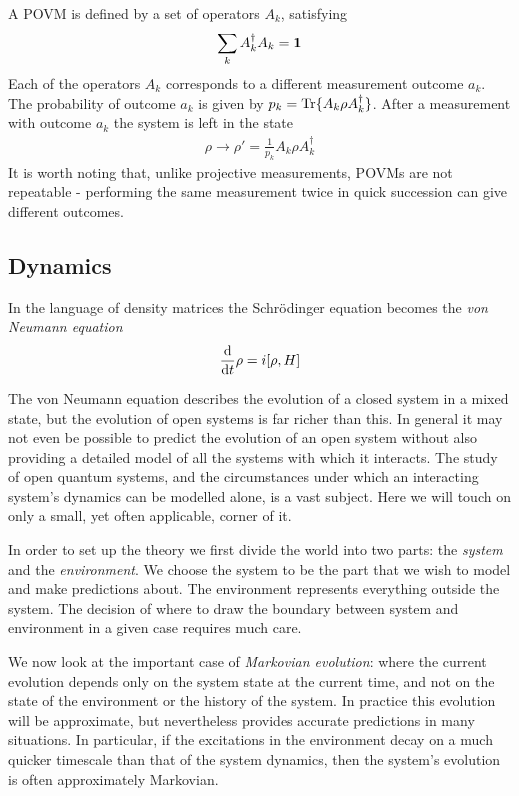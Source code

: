 A POVM  is defined by a set of operators $A_k$, satisfying
\begin{align}
  \label{POVM_completeness_eq}
  \sum_k A_k^\dagger A_k = \mathbf{1}
\end{align}
Each of the operators $A_k$ corresponds to a different measurement outcome $a_k$. The probability of outcome $a_k$ is given by $p_k = \operatorname{Tr}\{A_k \rho A_k^\dagger\}$. After a measurement with outcome $a_k$ the system is left in the state
\begin{align}\label{POVM_normalisation_eq}
  \rho \rightarrow \rho' = \frac{1}{p_k} A_k \rho A_k^\dagger
\end{align}
It is worth noting that, unlike projective measurements, POVMs are not repeatable - performing the same measurement twice in quick succession can give different outcomes.

\subsection{Dynamics}

In the language of density matrices the Schr\"odinger equation becomes the \textit{von Neumann equation}
\begin{align}
  \frac{\mathrm{d}}{\mathrm{d}t} \rho = i [\rho, H]
\end{align}

The von Neumann equation describes the evolution of a closed system in a mixed state, but the evolution of open systems is far richer than this. In general it may not even be possible to predict the evolution of an open system without also providing a detailed model of all the systems with which it interacts. The study of open quantum systems, and the circumstances under which an interacting system's dynamics can be modelled alone, is a vast subject. Here we will touch on only a small, yet often applicable, corner of it.

In order to set up the theory we first divide the world into two parts: the \textit{system} and the \textit{environment}. We choose the system to be the part that we wish to model and make predictions about. The environment represents everything outside the system. The decision of where to draw the boundary between system and environment in a given case requires much care.

We now look at the important case of \textit{Markovian evolution}: where the current evolution depends only on the system state at the current time, and not on the state of the environment or the history of the system. In practice this evolution will be approximate, but nevertheless provides accurate predictions in many situations. In particular, if the excitations in the environment decay on a much quicker timescale than that of the system dynamics, then the system's evolution is often approximately Markovian.

